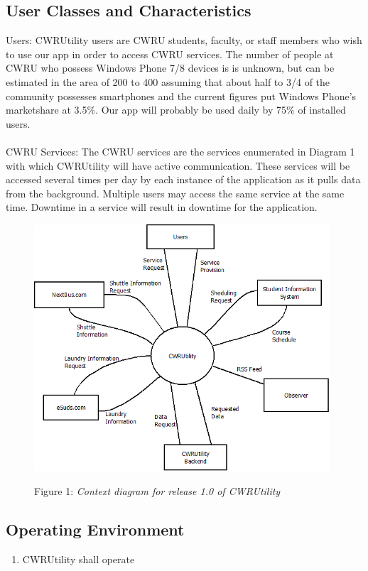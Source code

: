 \documentclass[pdftex,12pt,letter]{article}
\begin{document}
\subsection{User Classes and Characteristics}
\noindent Users: CWRUtility users are CWRU students, faculty, or staff members who wish to use our app in order to access CWRU services. The number of people at CWRU who possess Windows Phone 7/8 devices is is unknown, but can be estimated in the area of 200 to 400 assuming that about half to 3/4 of the community possesses smartphones and the current figures put Windows Phone's marketshare at 3.5\%. Our app will probably be used daily by 75\% of installed users.\\\\
CWRU Services:  The CWRU services are the services enumerated in Diagram 1 with which CWRUtility will have active communication. These services will be accessed several times per day by each instance of the application as it pulls data from the background. Multiple users may access the same service at the same time. Downtime in a service will result in downtime for the application.
\begin{figure}[h]
\begin{center}
\includegraphics[width=110mm]{ContextDiagram.png}\\
\caption{Figure 1: \emph{Context diagram for release 1.0 of CWRUtility}}
\end{center}
\end{figure}
\subsection{Operating Environment}
\begin{enumerate}[{O}E-1:]
\item CWRUtility shall operate 
\end{enumerate}
\end{document}
